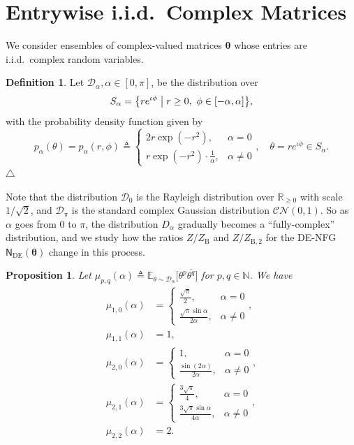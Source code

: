 \documentclass[conference]{IEEEtran}
\theoremstyle{plain}
\newtheorem{prop}[thm]{Proposition}
\theoremstyle{definition}
\newtheorem{definition}[thm]{Definition}
\newcommand{\edefn}{\hfill$\triangle$}
\providecommand{\N}{\mathbb {N}}
\providecommand{\R}{\mathbb {R}}
\newcommand{\B}{\mathrm{B}}
\newcommand{\E}{\mathbb {E}}
\newcommand{\sfn}{\mathsf{N}}
\newcommand{\btheta}{\boldsymbol{\theta}}
\newcommand{\defeq}{\triangleq}
\newcommand{\sfnDE}{\sfn_{\mathrm{DE}}}
\begin{document}
 \section{Entrywise i.i.d.~Complex Matrices}\label{appx:random:matrix}
 We consider ensembles of complex-valued matrices $\btheta$ whose entries are
 i.i.d.~complex random variables.
 \begin{definition}
  Let $\mathcal D_\alpha,\alpha\in[0,\pi]$, be the distribution over
  \[S_\alpha=
   \bigl\{
   r e^{\iota \phi}
   \bigm|
   r \ge 0,\ \phi \in [-\alpha,\alpha]
   \bigr\},\]
  with the probability density function given by
  \[
   p_\alpha(\theta)=p_\alpha(r,\phi)\defeq
   \begin{cases}
   2r\exp(-r^2),                     & \alpha=0    \\
   r\exp(-r^2)\cdot\frac{1}{\alpha}, & \alpha\neq0
   \end{cases},\quad \theta=re^{\iota\phi}\in S_\alpha.
  \]
  \edefn
 \end{definition}

 Note that the distribution $\mathcal D_0$ is the Rayleigh distribution over
 $\R_{\geq 0}$ with scale $1/\sqrt{2}$, and $\mathcal D_\pi$ is the standard
 complex Gaussian distribution $\mathcal {CN}(0,1)$. So as $\alpha$ goes from
 $0$ to $\pi$, the distribution $D_\alpha$ gradually becomes a
 ``fully-complex'' distribution, and we study how the ratios ${Z}/{Z_{\B}}$ and
 $ {Z}/{Z_{\B,2}}$ for the DE-NFG $\sfnDE(\btheta)$ change in this process.
 
 \begin{prop}
  Let $\mu_{p,q}(\alpha)\defeq\E_{\theta\sim \mathcal
    D_\alpha}\Big[\theta^p\overline{\theta^q}\Big]$ for $p,q\in \N$. We have
  \begin{align*}
   \mu_{1,0}(\alpha) & =
   \begin{cases}
   \frac{\sqrt \pi}{2},                  & \alpha=0     \\
   \frac{\sqrt \pi\sin \alpha}{2\alpha}, & \alpha\neq 0
   \end{cases},  \\
   \mu_{1,1}(\alpha) & =1,                               \\
   \mu_{2,0}(\alpha) & =
   \begin{cases}
   1,                             & \alpha=0     \\
   \frac{\sin(2\alpha)}{2\alpha}, & \alpha\neq 0
   \end{cases},         \\
   \mu_{2,1}(\alpha) & =
   \begin{cases}
   \frac{3\sqrt \pi}{4},                  & \alpha=0     \\
   \frac{3\sqrt \pi\sin \alpha}{4\alpha}, & \alpha\neq 0
   \end{cases}, \\
   \mu_{2,2}(\alpha) & =2.
  \end{align*}

 \end{prop}
\end{document}
